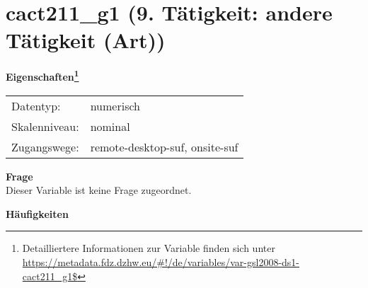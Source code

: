 
    \setcounter{footnote}{0}

    \vspace*{-1.8cm}
	\section{cact211\_g1 (9. Tätigkeit: andere Tätigkeit (Art))}
	\label{section:cact211_g1}



    \vspace*{0.5cm}
    \noindent\textbf{Eigenschaften\footnote{Detailliertere Informationen zur Variable finden sich unter
		\url{https://metadata.fdz.dzhw.eu/\#!/de/variables/var-gsl2008-ds1-cact211_g1$}}}\\
	\begin{tabularx}{\hsize}{@{}lX}
	Datentyp: & numerisch \\
	Skalenniveau: & nominal \\
	Zugangswege: &
	  remote-desktop-suf, 
	  onsite-suf
 \\
    \end{tabularx}



		\vspace*{0.5cm}
		\noindent\textbf{Frage}\\
		Dieser Variable ist keine Frage zugeordnet.





        		\vspace*{0.5cm}
                \noindent\textbf{Häufigkeiten}


